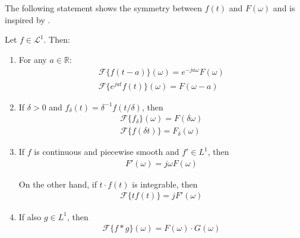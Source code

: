 \noindent
The following statement shows the symmetry between $f(t)$ and $F(\omega)$ and is inspired by \cite{page 214, FAA}.

\begin{theorem}
Let $f \in \mathcal{L}^1$. Then:

\begin{enumerate}[label=(\alph*)]
\item For any $a \in \mathbb{R}$:
\begin{align*}
\mathcal{F}\{f(t-a)\}(\omega) = e^{-ja\omega} F(\omega) \\
\mathcal{F}\{e^{jat}f(t)\}(\omega) = F(\omega - a)
\end{align*}

\item If $\delta > 0$ and $f_\delta(t)=\delta^{-1}f(t/\delta)$, then
\begin{align*}
\mathcal{F}\{f_\delta\}(\omega) = F(\delta\omega) \\
\mathcal{F}\{f(\delta t)\} = F_\delta(\omega)
\end{align*}

\item If $f$ is continuous and piecewise smooth and $f' \in L^1$, then
\begin{align*}
F'(\omega) = j\omega F(\omega)
\end{align*}

On the other hand, if $t\cdot f(t)$ is integrable, then
\begin{align*}
\mathcal{F}\{tf(t)\} = j F'(\omega)
\end{align*}

\item If also $g \in L^1$, then
\begin{align*}
\mathcal{F}\{f*g\}(\omega) = F(\omega) \cdot G(\omega)
\end{align*}
\end{enumerate}
\end{theorem}

